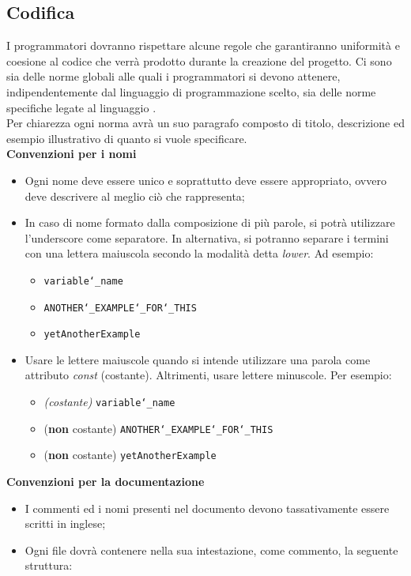 \subsection{Codifica}
I programmatori dovranno rispettare alcune regole che garantiranno uniformità e coesione al codice che verrà prodotto durante la creazione del progetto. Ci sono sia delle norme globali alle quali i programmatori si devono attenere, indipendentemente dal linguaggio di programmazione scelto, sia delle norme specifiche legate al linguaggio .\\[0.5cm]
Per chiarezza ogni norma avrà un suo paragrafo composto di titolo, descrizione ed esempio illustrativo di quanto si vuole specificare.\\[0.5cm]
\textbf{Convenzioni per i nomi}
\begin{itemize}
	\item Ogni nome deve essere unico e soprattutto deve essere appropriato, ovvero deve descrivere al meglio ciò che rappresenta;
	\item In caso di nome formato dalla composizione di più parole, si potrà utilizzare l’underscore come separatore. In alternativa, si potranno separare i termini con una lettera maiuscola secondo la modalità detta \textit{lower}. Ad esempio:
	\begin{itemize}
		\item \texttt{variable\char`_name}
		\item \texttt{ANOTHER\char`_EXAMPLE\char`_FOR\char`_THIS}
		\item \texttt{yetAnotherExample}
	\end{itemize}
	\item Usare le lettere maiuscole quando si intende utilizzare una parola come attributo \emph{const} (costante). Altrimenti, usare lettere minuscole. Per esempio:
	\begin{itemize}
		\item \emph{(costante)} \texttt{variable\char`_name}
		\item (\textbf{non} costante) \texttt{ANOTHER\char`_EXAMPLE\char`_FOR\char`_THIS}
		\item (\textbf{non} costante) \texttt{yetAnotherExample}
	\end{itemize}
\end{itemize}
\textbf{Convenzioni per la documentazione}
\begin{itemize}
	\item I commenti ed i nomi presenti nel documento devono tassativamente essere scritti in inglese;
	\item Ogni file dovrà contenere nella sua intestazione, come commento, la seguente struttura:
\end{itemize}
